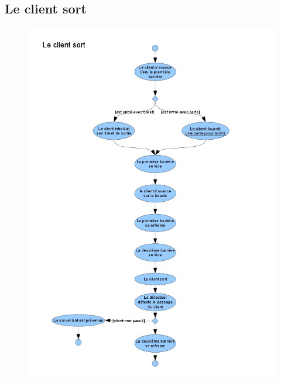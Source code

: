 \documentclass[a4paper]{article}
\begin{document}
\subsection{Le client sort}
\begin{figure}[!ht]
\centering
\includegraphics[scale=.5]{imgs/act_sort.jpg}
\end{figure}
\end{document}
